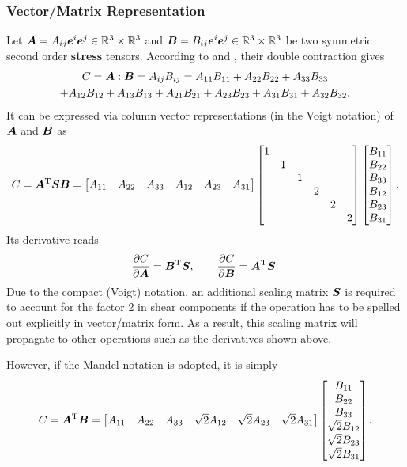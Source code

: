 \subsubsection{Vector/Matrix Representation}
Let $\bm{A}=A_{ij}\bm{e}^i\bm{e}^j\in\mathbb{R}^3\times\mathbb{R}^3$ and $\bm{B}=B_{ij}\bm{e}^i\bm{e}^j\in\mathbb{R}^3\times\mathbb{R}^3$ be two symmetric second order \textbf{stress} tensors.
According to  and , their double contraction gives
\begin{multline}
C=\bm{A}:\bm{B}=A_{ij}B_{ij}=A_{11}B_{11}+A_{22}B_{22}+A_{33}B_{33}\\+A_{12}B_{12}+A_{13}B_{13}+A_{21}B_{21}+A_{23}B_{23}+A_{31}B_{31}+A_{32}B_{32}.
\end{multline}
It can be expressed via column vector representations (in the Voigt notation) of $\bm{A}$ and $\bm{B}$ as
\begin{gather}
C=\bm{A}^{\mathrm{T}}\bm{S}\bm{B}=\begin{bmatrix}
A_{11}&A_{22}&A_{33}&A_{12}&A_{23}&A_{31}
\end{bmatrix}
\begin{bmatrix}
1&&&&&\\
&1&&&&\\
&&1&&&\\
&&&2&&\\
&&&&2&\\
&&&&&2
\end{bmatrix}
\begin{bmatrix}
B_{11}\\B_{22}\\B_{33}\\B_{12}\\B_{23}\\B_{31}
\end{bmatrix}.
\end{gather}
Its derivative reads
\begin{gather}
\dfrac{\partial{C}}{\partial{\bm{A}}}=\bm{B}^{\mathrm{T}}\bm{S},\qquad
\dfrac{\partial{C}}{\partial{\bm{B}}}=\bm{A}^{\mathrm{T}}\bm{S}.
\end{gather}
Due to the compact (Voigt) notation, an additional scaling matrix $\bm{S}$ is required to account for the factor \num{2} in shear components if the operation has to be spelled out explicitly in vector/matrix form.
As a result, this scaling matrix will propagate to other operations such as the derivatives shown above.

However, if the Mandel notation is adopted, it is simply
\begin{gather}
C=\bm{A}^{\mathrm{T}}\bm{B}=\begin{bmatrix}
A_{11}&A_{22}&A_{33}&\sqrt{2}A_{12}&\sqrt{2}A_{23}&\sqrt{2}A_{31}
\end{bmatrix}
\begin{bmatrix}
B_{11}\\B_{22}\\B_{33}\\\sqrt{2}B_{12}\\\sqrt{2}B_{23}\\\sqrt{2}B_{31}
\end{bmatrix}.
\end{gather}

